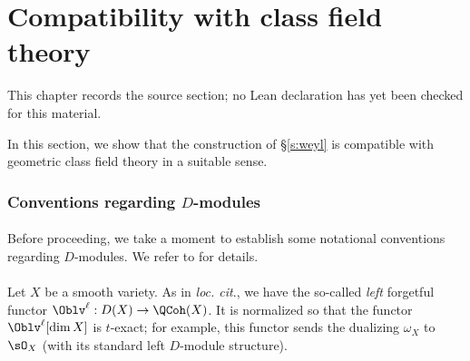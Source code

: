 \chapter{Compatibility with class field theory}
\label{tates-thesis-de-rham-setting-chapter-06}

\begin{remark}
\label{tates-thesis-de-rham-setting-chapter-06-source}
This chapter records the source section; no Lean declaration has yet been checked for this material.
\notready
\end{remark}

\label{s:cft}

In this section, we show that the construction of \S \ref{s:weyl} is compatible
with geometric class field theory in a suitable sense.

\subsection{Conventions regarding $D$-modules}\label{ss:diff-1}

\subsubsection{} Before proceeding, we take a moment to establish some
notational conventions regarding $D$-modules.
We refer to \cite{crystals} for details.

\subsubsection{}

Let $X$ be a smooth variety. As in \emph{loc. cit}.,
we have the so-called \emph{left} forgetful functor
$\Oblv^{\ell}:D(X) \to \QCoh(X)$. It is normalized
so that the functor $\Oblv^{\ell}[\dim X]$
is $t$-exact; for example, this functor sends the dualizing
$\omega_X$ to $\sO_X$ (with its standard left $D$-module structure).

\subsubsection{}

